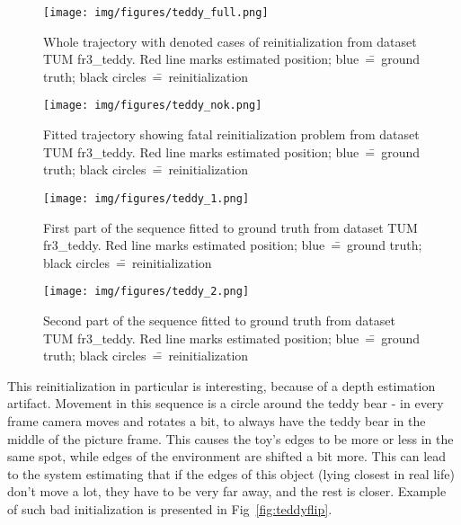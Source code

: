 \begin{figure}[ht]
	\centering\texttt{[image: img/figures/teddy\_full.png]}
	\caption{ Whole trajectory with denoted cases of reinitialization from dataset TUM fr3\_teddy. Red line marks estimated position; blue~\==~ground truth; black circles~\==~reinitialization }
	\label{fig:teddyfull}
\end{figure}
\begin{figure}[ht]
	\centering\texttt{[image: img/figures/teddy\_nok.png]}
	\caption{ Fitted trajectory showing fatal reinitialization problem from dataset TUM fr3\_teddy. Red line marks estimated position; blue~\==~ground truth; black circles~\==~reinitialization }
	\label{fig:teddynok}
\end{figure}
\begin{figure}[ht]
	\centering\texttt{[image: img/figures/teddy\_1.png]}
	\caption{ First part of the sequence fitted to ground truth from dataset TUM fr3\_teddy. Red line marks estimated position; blue~\==~ground truth; black circles~\==~reinitialization }
	\label{fig:teddy1}
\end{figure}
\begin{figure}[ht]
	\centering\texttt{[image: img/figures/teddy\_2.png]}
	\caption{ Second part of the sequence fitted to ground truth from dataset TUM fr3\_teddy. Red line marks estimated position; blue~\==~ground truth; black circles~\==~reinitialization }
	\label{fig:teddy2}
\end{figure}

This reinitialization in particular is interesting, because of a depth estimation artifact. Movement in this sequence is a circle around the teddy bear - in every frame camera moves and rotates a bit, to always have the teddy bear in the middle of the picture frame. This causes the toy's edges to be more or less in the same spot, while edges of the environment are shifted a bit more. This can lead to the system estimating that if the edges of this object (lying closest in real life) don't move a lot, they have to be very far away, and the rest is closer. Example of such bad initialization is presented in Fig~\ref{fig:teddyflip}.


